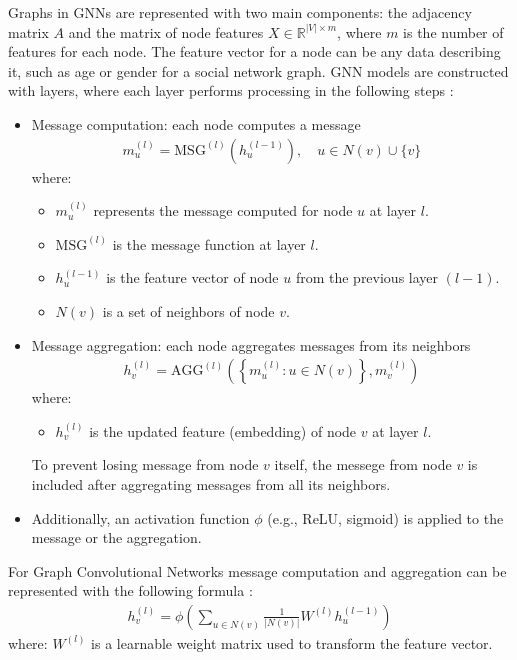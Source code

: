 Graphs in GNNs are represented with two main components: the adjacency matrix $A$ and the matrix of node features $X \in \mathbb{R}^{|V| \times m}$, where $m$ is the number of features for each node. The feature vector for a node can be any data describing it, such as age or gender for a social network graph. GNN models are constructed with layers, where each layer performs processing in the following steps \cite{Lesk2024}:
\begin{itemize}
    \item Message computation: each node computes a message 
        \begin{align}
            m_u^{(l)} = \text{MSG}^{(l)}(h_u^{(l-1)}), \quad u \in N(v) \cup \{v\}
        \end{align}
        where:
        \begin{itemize}
            \item $m_u^{(l)}$ represents the message computed for node $u$ at layer $l$.
            \item $\text{MSG}^{(l)}$ is the message function at layer $l$.
            \item $h_u^{(l-1)}$ is the feature vector of node $u$ from the previous layer $(l-1)$.
            \item $N(v)$ is a set of neighbors of node $v$.
        \end{itemize}
    \item Message aggregation: each node aggregates messages from its neighbors
        \begin{align}
            h_v^{(l)} = \text{AGG}^{(l)}\left(\left\{ m_u^{(l)} : u \in N(v) \right\}, m_v^{(l)}\right)
        \end{align}
        where:
        \begin{itemize}
            \item $h_v^{(l)}$ is the updated feature (embedding) of node $v$ at layer $l$. 
        \end{itemize}
        To prevent losing message from node $v$ itself, the messege from node $v$ is included after aggregating messages from all its neighbors.   
    \item Additionally, an activation function $\phi$ (e.g., ReLU, sigmoid) is applied to the message or the aggregation.
\end{itemize}

For Graph Convolutional Networks message computation and aggregation can be represented with the following formula \cite{Lesk2024}:
\begin{align}
    h_v^{(l)} = \phi \left( \sum_{u \in N(v)} \frac{1}{|N(v)|} W^{(l)} h_u^{(l-1)} \right)
\end{align}
where:
$W^{(l)}$ is a learnable weight matrix used to transform the feature vector.

